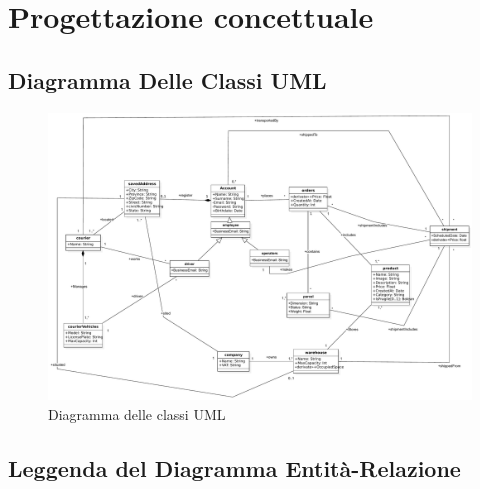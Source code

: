 \section{Progettazione concettuale}

\subsection{Diagramma Delle Classi UML}

\begin{figure}[ht]
    \centering
    \includegraphics[scale=0.4]{imgs/umlConcettuale.pdf}
    \caption{Diagramma delle classi UML}
\end{figure}

\newpage

\subsection{Leggenda del Diagramma Entità-Relazione}

